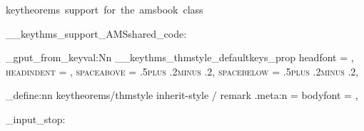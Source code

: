   {keytheorems~support~for~the~amsbook~class}

\__keythms_support_AMSshared_code:

\prop_gput_from_keyval:Nn \g__keythms_thmstyle_defaultkeys_prop
  {
    headfont   = \scshape,
    headindent = \parindent,
    spaceabove = .5\baselineskip plus .2\baselineskip minus .2\baselineskip,
    spacebelow = .5\baselineskip plus .2\baselineskip minus .2\baselineskip,
  }

\keys_define:nn { keytheorems/thmstyle }
  {
    inherit-style / remark .meta:n = { bodyfont = \normalfont },
  }

\file_input_stop: